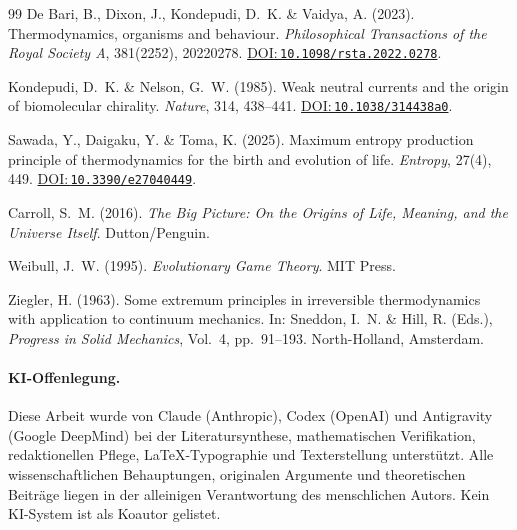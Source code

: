 \documentclass[12pt,a4paper]{article}
\newcommand{\doilink}[1]{\href{https://doi.org/#1}{DOI:\,\nolinkurl{#1}}}
\theoremstyle{remark}
\begin{document}
\begin{thebibliography}{99}
De Bari, B., Dixon, J., Kondepudi, D.~K. \& Vaidya, A. (2023).
\newblock Thermodynamics, organisms and behaviour.
\newblock \textit{Philosophical Transactions of the Royal Society A}, 381(2252), 20220278.
\newblock \doilink{10.1098/rsta.2022.0278}.

Kondepudi, D.~K. \& Nelson, G.~W. (1985).
\newblock Weak neutral currents and the origin of biomolecular chirality.
\newblock \textit{Nature}, 314, 438--441.
\newblock \doilink{10.1038/314438a0}.

Sawada, Y., Daigaku, Y. \& Toma, K. (2025).
\newblock Maximum entropy production principle of thermodynamics for the birth and evolution of life.
\newblock \textit{Entropy}, 27(4), 449.
\newblock \doilink{10.3390/e27040449}.

Carroll, S.~M. (2016).
\newblock \textit{The Big Picture: On the Origins of Life, Meaning, and the Universe Itself}.
\newblock Dutton/Penguin.

Weibull, J.~W. (1995).
\newblock \textit{Evolutionary Game Theory}.
\newblock MIT Press.

Ziegler, H. (1963).
\newblock Some extremum principles in irreversible thermodynamics with application to continuum mechanics.
\newblock In: Sneddon, I.~N. \& Hill, R. (Eds.), \textit{Progress in Solid Mechanics}, Vol.~4, pp.~91--193. North-Holland, Amsterdam.

\end{thebibliography}
\medskip
\paragraph*{KI-Offenlegung.} Diese Arbeit wurde von Claude (Anthropic), Codex (OpenAI) und Antigravity (Google DeepMind) bei der Literatursynthese, mathematischen Verifikation, redaktionellen Pflege, LaTeX-Typographie und Texterstellung unterstützt. Alle wissenschaftlichen Behauptungen, originalen Argumente und theoretischen Beiträge liegen in der alleinigen Verantwortung des menschlichen Autors. Kein KI-System ist als Koautor gelistet.
\endgroup
\end{document}
